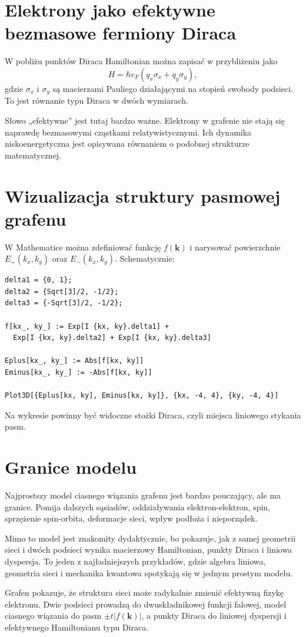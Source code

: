 \section{Elektrony jako efektywne bezmasowe fermiony Diraca}

W pobliżu punktów Diraca Hamiltonian można zapisać w przybliżeniu jako
\begin{equation}
    H=\hbar v_F\left(q_x\sigma_x+q_y\sigma_y\right),
\end{equation}
gdzie \(\sigma_x\) i \(\sigma_y\) są macierzami Pauliego działającymi na stopień swobody podsieci. To jest równanie typu Diraca w dwóch wymiarach.

Słowo „efektywne” jest tutaj bardzo ważne. Elektrony w grafenie nie stają się naprawdę bezmasowymi cząstkami relatywistycznymi. Ich dynamika niskoenergetyczna jest opisywana równaniem o podobnej strukturze matematycznej.

\section{Wizualizacja struktury pasmowej grafenu}

W Mathematice można zdefiniować funkcję \(f(\mathbf{k})\) i narysować powierzchnie \(E_+(k_x,k_y)\) oraz \(E_-(k_x,k_y)\). Schematycznie:
\begin{verbatim}
delta1 = {0, 1};
delta2 = {Sqrt[3]/2, -1/2};
delta3 = {-Sqrt[3]/2, -1/2};

f[kx_, ky_] := Exp[I {kx, ky}.delta1] +
  Exp[I {kx, ky}.delta2] + Exp[I {kx, ky}.delta3]

Eplus[kx_, ky_] := Abs[f[kx, ky]]
Eminus[kx_, ky_] := -Abs[f[kx, ky]]

Plot3D[{Eplus[kx, ky], Eminus[kx, ky]}, {kx, -4, 4}, {ky, -4, 4}]
\end{verbatim}
Na wykresie powinny być widoczne stożki Diraca, czyli miejsca liniowego stykania pasm.

\section{Granice modelu}

Najprostszy model ciasnego wiązania grafenu jest bardzo pouczający, ale ma granice. Pomija dalszych sąsiadów, oddziaływania elektron-elektron, spin, sprzężenie spin-orbita, deformacje sieci, wpływ podłoża i nieporządek.

Mimo to model jest znakomity dydaktycznie, bo pokazuje, jak z samej geometrii sieci i dwóch podsieci wynika macierzowy Hamiltonian, punkty Diraca i liniowa dyspersja. To jeden z najładniejszych przykładów, gdzie algebra liniowa, geometria sieci i mechanika kwantowa spotykają się w jednym prostym modelu.

\begin{summarybox}
Grafen pokazuje, że struktura sieci może radykalnie zmienić efektywną fizykę elektronu. Dwie podsieci prowadzą do dwuskładnikowej funkcji falowej, model ciasnego wiązania do pasm \(\pm t|f(\mathbf{k})|\), a punkty Diraca do liniowej dyspersji i efektywnego Hamiltonianu typu Diraca.
\end{summarybox}
